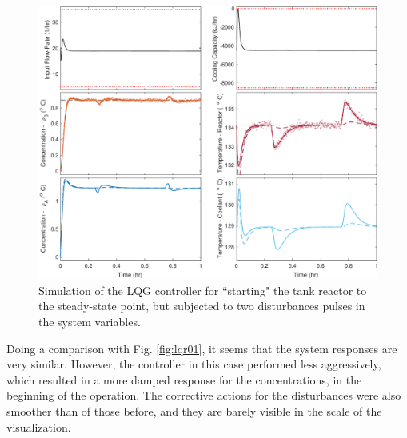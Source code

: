 \documentclass[a4paper,11pt]{book}
\numberwithin{figure}{chapter}
\numberwithin{equation}{chapter}
\numberwithin{table}{chapter}
\theoremstyle{definition}
\begin{document}
\begin{figure}[ht] \centering
	\includegraphics[width=\textwidth]{chapter7/lqg02}
	\caption{Simulation of the LQG controller for ``starting" the tank reactor to the steady-state point, but subjected to two disturbances pulses in the system variables.}
	\label{fig:lqg02Sim}
\end{figure}	

Doing a comparison with Fig. \ref{fig:lqr01}, it seems that the system responses are very similar. However, the controller in this case performed less aggressively, which resulted in a more damped response for the concentrations, in the beginning of the operation. The corrective actions for the disturbances were also smoother than of those before, and they are barely visible in the scale of the visualization. 
\end{document}
